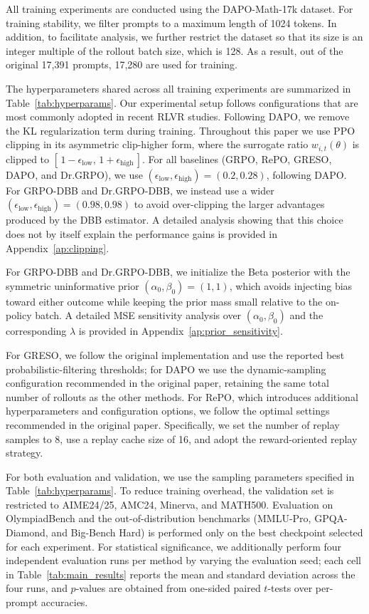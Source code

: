 All training experiments are conducted using the DAPO-Math-17k dataset.
For training stability, we filter prompts to a maximum length of 1024 tokens.
In addition, to facilitate analysis, we further restrict the dataset so that its size is an integer multiple of the rollout batch size, which is 128.
As a result, out of the original 17,391 prompts, 17,280 are used for training.


The hyperparameters shared across all training experiments are summarized in Table~\ref{tab:hyperparams}.
Our experimental setup follows configurations that are most commonly adopted in recent RLVR studies.
Following DAPO, we remove the KL regularization term during training.
Throughout this paper we use PPO clipping in its asymmetric clip-higher form, where the surrogate ratio $w_{i,t}(\theta)$ is clipped to $[\,1-\epsilon_{\mathrm{low}},\,1+\epsilon_{\mathrm{high}}\,]$.
For all baselines (GRPO, RePO, GRESO, DAPO, and Dr.GRPO), we use $(\epsilon_{\mathrm{low}},\epsilon_{\mathrm{high}})=(0.2,0.28)$, following DAPO.
For GRPO-DBB and Dr.GRPO-DBB, we instead use a wider $(\epsilon_{\mathrm{low}},\epsilon_{\mathrm{high}})=(0.98,0.98)$ to avoid over-clipping the larger advantages produced by the DBB estimator.
A detailed analysis showing that this choice does not by itself explain the performance gains is provided in Appendix~\ref{ap:clipping}.

For GRPO-DBB and Dr.GRPO-DBB, we initialize the Beta posterior with the symmetric uninformative prior $(\alpha_0,\beta_0)=(1,1)$, which avoids injecting bias toward either outcome while keeping the prior mass small relative to the on-policy batch.
A detailed MSE sensitivity analysis over $(\alpha_0,\beta_0)$ and the corresponding $\lambda$ is provided in Appendix~\ref{ap:prior_sensitivity}.

For GRESO, we follow the original implementation and use the reported best probabilistic-filtering thresholds; for DAPO we use the dynamic-sampling configuration recommended in the original paper, retaining the same total number of rollouts as the other methods.
For RePO, which introduces additional hyperparameters and configuration options, we follow the optimal settings recommended in the original paper.
Specifically, we set the number of replay samples to 8, use a replay cache size of 16, and adopt the reward-oriented replay strategy.

For both evaluation and validation, we use the sampling parameters specified in Table~\ref{tab:hyperparams}.
To reduce training overhead, the validation set is restricted to AIME24/25, AMC24, Minerva, and MATH500.
Evaluation on OlympiadBench and the out-of-distribution benchmarks (MMLU-Pro, GPQA-Diamond, and Big-Bench Hard) is performed only on the best checkpoint selected for each experiment.
For statistical significance, we additionally perform four independent evaluation runs per method by varying the evaluation seed; each cell in Table~\ref{tab:main_results} reports the mean and standard deviation across the four runs, and $p$-values are obtained from one-sided paired $t$-tests over per-prompt accuracies.


